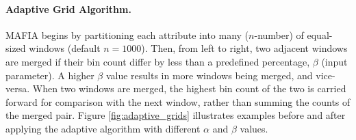 \paragraph{Adaptive Grid Algorithm.}
MAFIA begins by partitioning each attribute into many ($n$-number) of equal-sized windows (default $n = 1000$). Then, from left to right, two adjacent windows are merged if their bin count differ by less than a predefined percentage, $\beta$ (input parameter). A higher $\beta$ value results in more windows being merged, and vice-versa. When two windows are merged, the highest bin count of the two is carried forward for comparison with the next window, rather than summing the counts of the merged pair. Figure \ref{fig:adaptive_grids} illustrates examples before and after applying the adaptive algorithm with different $\alpha$ and $\beta$ values.

